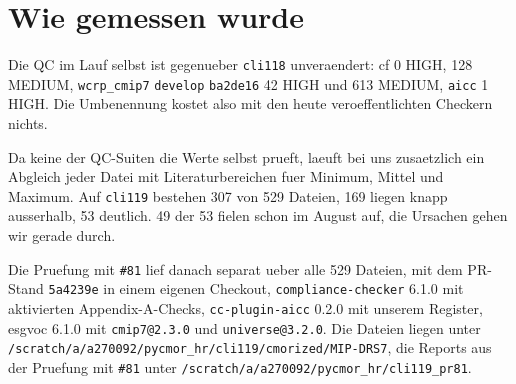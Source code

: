 \documentclass[11pt,a4paper]{article}
\newcommand{\code}[1]{\texttt{\small #1}}
\begin{document}
\section{Wie gemessen wurde}

Die QC im Lauf selbst ist gegenueber \code{cli118} unveraendert: cf 0 HIGH, 128
MEDIUM, \code{wcrp\_cmip7} \code{develop} \code{ba2de16} 42 HIGH und 613 MEDIUM,
\code{aicc} 1 HIGH. Die Umbenennung kostet also mit den heute veroeffentlichten
Checkern nichts.

Da keine der QC-Suiten die Werte selbst prueft, laeuft bei uns zusaetzlich ein
Abgleich jeder Datei mit Literaturbereichen fuer Minimum, Mittel und Maximum. Auf
\code{cli119} bestehen 307 von 529 Dateien, 169 liegen knapp ausserhalb, 53 deutlich.
49 der 53 fielen schon im August auf, die Ursachen gehen wir gerade durch.

Die Pruefung mit \code{\#81} lief danach separat ueber alle 529 Dateien, mit dem
PR-Stand \code{5a4239e} in einem eigenen Checkout, \code{compliance-checker}
6.1.0 mit aktivierten Appendix-A-Checks, \code{cc-plugin-aicc} 0.2.0 mit unserem
Register, esgvoc 6.1.0 mit \code{cmip7@2.3.0} und \code{universe@3.2.0}. Die
Dateien liegen unter
\code{/scratch/a/a270092/pycmor\_hr/cli119/cmorized/MIP-DRS7}, die Reports aus der
Pruefung mit \code{\#81} unter \code{/scratch/a/a270092/pycmor\_hr/cli119\_pr81}.
\end{document}
